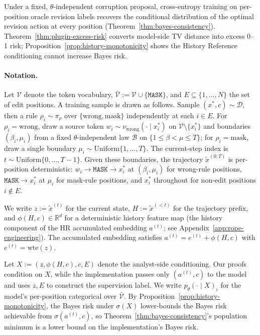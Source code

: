 \documentclass{llmxive}
\providecommand{\temporalmethodfull}{History Reference\xspace}
\providecommand{\temporalmethod}{HR\xspace}
\providecommand{\xstar}{x^{\ast}}
\providecommand{\mask}{\texttt{MASK}}
\begin{document}
Under a fixed, $\theta$-independent corruption proposal, cross-entropy training on per-position oracle revision labels recovers the conditional distribution of the optimal revision action at every position (Theorem~\ref{thm:bayes-consistency}). Theorem~\ref{thm:plugin-excess-risk} converts model-side TV distance into excess 0--1 risk; Proposition~\ref{prop:history-monotonicity} shows the \temporalmethodfull conditioning cannot increase Bayes risk.

\paragraph{Notation.}
Let $\mathcal{V}$ denote the token vocabulary, $\bar{\mathcal{V}} := \mathcal{V} \cup \{\mask\}$, and $E \subseteq \{1, \ldots, N\}$ the set of edit positions. A training sample is drawn as follows. Sample $(\xstar, c) \sim \mathcal{D}$, then a rule $\rho_i \sim \pi_\rho$ over $\{\mathrm{wrong}, \mathrm{mask}\}$ independently at each $i \in E$. For $\rho_i = \mathrm{wrong}$, draw a source token $w_i \sim \nu_{\mathrm{wrong}}(\cdot \mid \xstar_i)$ on $\mathcal{V} \setminus \{\xstar_i\}$ and boundaries $(\beta_i, \mu_i)$ from a fixed $\theta$-independent law $\mathcal{B}$ on $\{1 \le \beta < \mu \le T\}$; for $\rho_i = \mathrm{mask}$, draw a single boundary $\mu_i \sim \mathrm{Uniform}\{1, \ldots, T\}$. The current-step index is $t \sim \mathrm{Uniform}\{0, \ldots, T-1\}$. Given these boundaries, the trajectory $\tilde{x}^{(0:T)}$ is per-position deterministic: $w_i \to \mask \to \xstar_i$ at $(\beta_i, \mu_i)$ for wrong-rule positions, $\mask \to \xstar_i$ at $\mu_i$ for mask-rule positions, and $\xstar_i$ throughout for non-edit positions $i \notin E$.

We write $z := \tilde{x}^{(t)}$ for the current state, $H := \tilde{x}^{(<t)}$ for the trajectory prefix, and $\phi(H, c) \in \mathbb{R}^d$ for a deterministic history feature map (the history component of the \temporalmethod accumulated embedding $a^{(t)}$; see Appendix~\ref{app:rope-engineering}). The accumulated embedding satisfies $a^{(t)} = e^{(t)} + \phi(H, c)$ with $e^{(t)} = \mathrm{wte}(z)$.

Let $X := (z, \phi(H, c), c, E)$ denote the analyst-side conditioning. Our proofs condition on $X$, while the implementation passes only $(a^{(t)}, c)$ to the model and uses $z, E$ to construct the supervision label. We write $p_\theta(\cdot \mid X)_i$ for the model's per-position categorical over $\bar{\mathcal{V}}$. By Proposition~\ref{prop:history-monotonicity}, the Bayes risk under $\sigma(X)$ lower-bounds the Bayes risk achievable from $\sigma(a^{(t)}, c)$, so Theorem~\ref{thm:bayes-consistency}'s population minimum is a lower bound on the implementation's Bayes risk.
\end{document}
